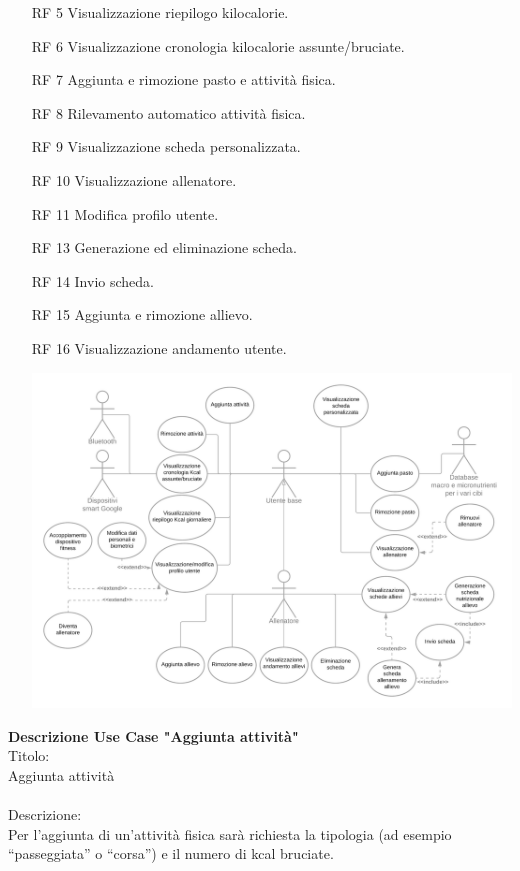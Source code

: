 \documentclass{article}
\begin{document}
\begin{itemize}
   \item[RF 5] Visualizzazione riepilogo kilocalorie.
   \item[RF 6] Visualizzazione cronologia kilocalorie assunte/bruciate.
   \item[RF 7] Aggiunta e rimozione pasto e attività fisica.
   \item[RF 8] Rilevamento automatico attività fisica.
   \item[RF 9] Visualizzazione scheda personalizzata.
   \item[RF 10] Visualizzazione allenatore.
   \item[RF 11] Modifica profilo utente.
   \item[RF 13] Generazione ed eliminazione scheda.
   \item[RF 14] Invio scheda.
   \item[RF 15] Aggiunta e rimozione allievo.
   \item[RF 16] Visualizzazione andamento utente.
   \begin{center}
      \includegraphics[width=175mm]{Utente base.png}
   \end{center}
\end{itemize}
\textbf{Descrizione Use Case "Aggiunta attività"}\\
\newline
Titolo: \\
Aggiunta attività\\
\\
Descrizione:\\
Per l’aggiunta di un’attività fisica sarà richiesta la tipologia (ad esempio “passeggiata” o “corsa”) e il numero di kcal bruciate.\\
\end{document}

